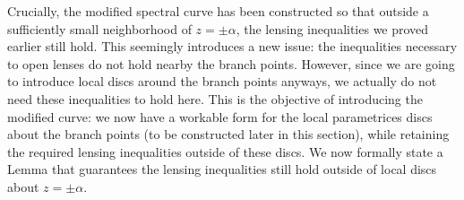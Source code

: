 \documentclass[usenames,dvipsnames]{article}
\theoremstyle{definition}
\numberwithin{equation}{section}
\numberwithin{figure}{section}
\begin{document}
Crucially, the modified spectral curve has been constructed so that outside a sufficiently small neighborhood of $z = \pm \alpha$, the lensing 
inequalities we proved earlier still hold. This seemingly introduces a new issue: the inequalities necessary to open lenses do not hold nearby the
branch points. However, since we are going to introduce local discs around the branch points anyways, we actually do not need these inequalities to
hold here. This is the objective of introducing the modified curve: we now have a workable form for the local parametrices discs about the branch 
points (to be constructed later in this section), while retaining the required lensing inequalities outside of these discs. We now formally state a Lemma that guarantees the lensing inequalities still hold outside of local discs about $z = \pm \alpha$.
\end{document}
